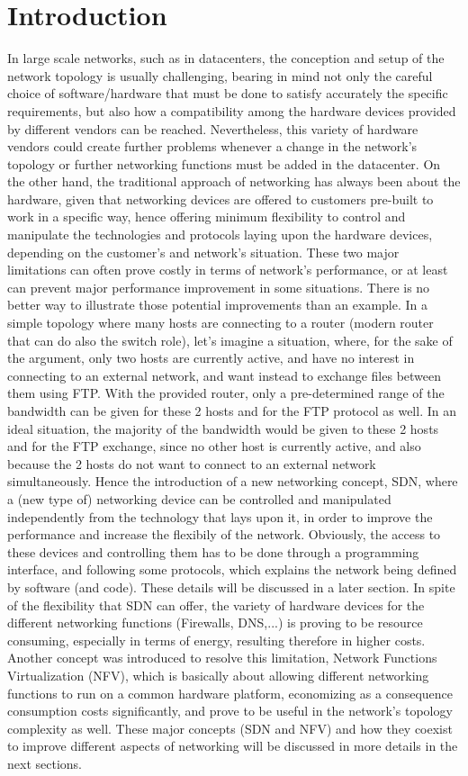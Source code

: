 \section{Introduction}
\setcounter{page}{1} 
In large scale networks, such as in datacenters, the conception and setup of the network topology is usually challenging, bearing in mind not only the careful choice of software/hardware that must be done to satisfy accurately the specific requirements, but also how a compatibility among the hardware devices provided by different vendors can be reached. Nevertheless, this variety of hardware vendors could create further problems whenever a change in the network's topology or further networking functions must be added in the datacenter. On the other hand, the traditional approach of networking has always been about the hardware, given that networking devices are offered to customers pre-built to work in a specific way, hence offering minimum flexibility to control and manipulate the technologies and protocols laying upon the hardware devices, depending on the customer’s and network’s situation. These two major limitations can often prove costly in terms of network’s performance, or at least can prevent major performance improvement in some situations. There is no better way to illustrate those potential improvements than an example. In a simple topology where many hosts are connecting to a router (modern router that can do also the switch role), let’s imagine a situation, where, for the sake of the argument, only two hosts are currently active, and have no interest in connecting to an external network, and want instead to exchange files between them using FTP. With the provided router, only a pre-determined range of the bandwidth can be given for these 2 hosts and for the FTP protocol as well. In an ideal situation, the majority of the bandwidth would be given to these 2 hosts and for the FTP exchange, since no other host is currently active, and also because the 2 hosts do not want to connect to an external network simultaneously. Hence the introduction of a new networking concept, SDN, where a (new type of) networking device can be controlled and manipulated independently from the technology that lays upon it, in order to improve the performance and increase the flexibily of the network. Obviously, the access to these devices and controlling them has to be done through a programming interface, and following some protocols, which explains the network being defined by software (and code). These details will be discussed in a later section. In spite of the flexibility that SDN can offer, the variety of hardware devices for the different networking functions (Firewalls, DNS,...) is proving to be resource consuming, especially in terms of energy, resulting therefore in higher costs. Another concept was introduced to resolve this limitation, Network Functions Virtualization (NFV), which is basically about allowing different networking functions to run on a common hardware platform, economizing as a consequence consumption costs significantly, and prove to be useful in the network’s topology complexity as well. These major concepts (SDN and NFV) and how they coexist to improve different aspects of networking will be discussed in more details in the next sections.
\newpage
